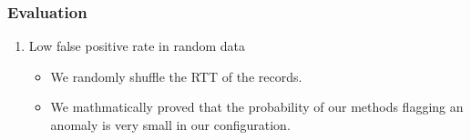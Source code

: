 %

\begin{frame}
    \frametitle{Evaluation}
    \begin{enumerate}
        \item Low false positive rate in random data
        \begin{itemize}
            \item We randomly shuffle the RTT of the records.
            \item We mathmatically proved that the probability of our methods flagging an anomaly is very small in our configuration.
        \end{itemize}
    \end{enumerate}
\end{frame}


